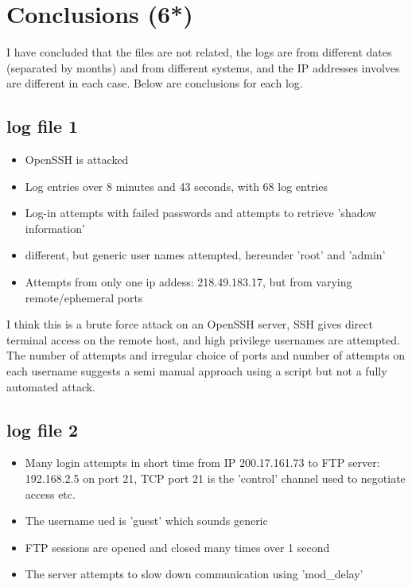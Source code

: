 \documentclass[
	letterpaper, %
	10pt, %
	unnumberedsections, %
	twoside, %
]{APAAssignment}
\begin{document}
\section{Conclusions (6*)}
I have concluded that the files are not related, the logs are from different dates (separated by months) and from different systems, and the IP addresses involves are different in each case. Below are conclusions for each log.



\subsection{log file 1}
\begin{itemize}
  \item OpenSSH is attacked  
  \item Log entries over 8 minutes and 43 seconds, with 68 log entries
  \item Log-in attempts with failed passwords and attempts to retrieve 'shadow information'
  \item different, but generic user names attempted, hereunder 'root' and 'admin'
  \item Attempts from only one ip addess: 218.49.183.17, but from varying remote/ephemeral ports
\end{itemize}

I think this is a brute force attack on an OpenSSH server, SSH gives direct terminal access on the remote host, and high privilege usernames are attempted. The number of attempts and irregular choice of ports and number of attempts on each username suggests a semi manual approach using a script but not a fully automated attack.


\subsection{log file 2}
\begin{itemize}
	\item Many login attempts in short time from IP 200.17.161.73 to FTP server: 192.168.2.5 on port 21, TCP port 21 is the 'control' channel used to negotiate access etc. 
	\item The username ued is 'guest' which sounds generic
	\item FTP sessions are opened and closed many times over 1 second
	\item The server attempts to slow down communication using 'mod\_delay'
\end{itemize}
\end{document}
